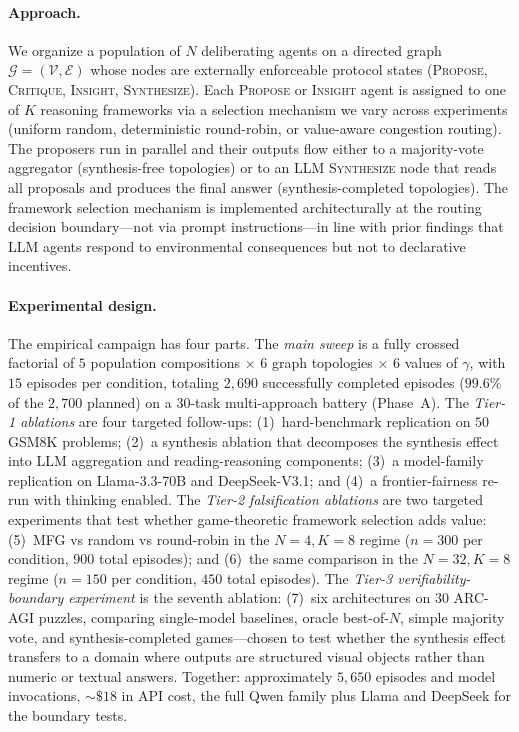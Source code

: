 \documentclass[11pt]{amsart}
\newcommand{\g}{\gamma}
\newcommand\1{{\mathds{1}}}
\newcommand\V{{\mathcal{V}}}
\newcommand\G{{\mathcal{G}}}
\theoremstyle{definition}
\theoremstyle{remark}
\numberwithin{equation}{section}
\begin{document}
\paragraph{Approach.}
We organize a population of $N$ deliberating agents on a directed graph $\G = (\V, \mathcal{E})$ whose nodes are externally enforceable protocol states (\textsc{Propose}, \textsc{Critique}, \textsc{Insight}, \textsc{Synthesize}).
Each \textsc{Propose} or \textsc{Insight} agent is assigned to one of $K$ reasoning frameworks via a selection mechanism we vary across experiments (uniform random, deterministic round-robin, or value-aware congestion routing).
The proposers run in parallel and their outputs flow either to a majority-vote aggregator (synthesis-free topologies) or to an LLM \textsc{Synthesize} node that reads all proposals and produces the final answer (synthesis-completed topologies).
The framework selection mechanism is implemented architecturally at the routing decision boundary---not via prompt instructions---in line with prior findings that LLM agents respond to environmental consequences but not to declarative incentives.

\paragraph{Experimental design.}
The empirical campaign has four parts.
The \emph{main sweep} is a fully crossed factorial of $5$ population compositions $\times$ $6$ graph topologies $\times$ $6$ values of $\g$, with $15$ episodes per condition, totaling $2{,}690$ successfully completed episodes ($99.6\%$ of the $2{,}700$ planned) on a $30$-task multi-approach battery (Phase~A).
The \emph{Tier-1 ablations} are four targeted follow-ups: (1)~hard-benchmark replication on $50$ GSM8K problems; (2)~a synthesis ablation that decomposes the synthesis effect into LLM aggregation and reading-reasoning components; (3)~a model-family replication on Llama-3.3-70B and DeepSeek-V3.1; and (4)~a frontier-fairness re-run with thinking enabled.
The \emph{Tier-2 falsification ablations} are two targeted experiments that test whether game-theoretic framework selection adds value: (5)~MFG vs random vs round-robin in the $N\!=\!4, K\!=\!8$ regime ($n\!=\!300$ per condition, $900$ total episodes); and (6)~the same comparison in the $N\!=\!32, K\!=\!8$ regime ($n\!=\!150$ per condition, $450$ total episodes).
The \emph{Tier-3 verifiability-boundary experiment} is the seventh ablation: (7)~six architectures on $30$ ARC-AGI puzzles, comparing single-model baselines, oracle best-of-$N$, simple majority vote, and synthesis-completed games---chosen to test whether the synthesis effect transfers to a domain where outputs are structured visual objects rather than numeric or textual answers.
Together: approximately $5{,}650$ episodes and model invocations, $\sim\$18$ in API cost, the full Qwen family plus Llama and DeepSeek for the boundary tests.
\end{document}

